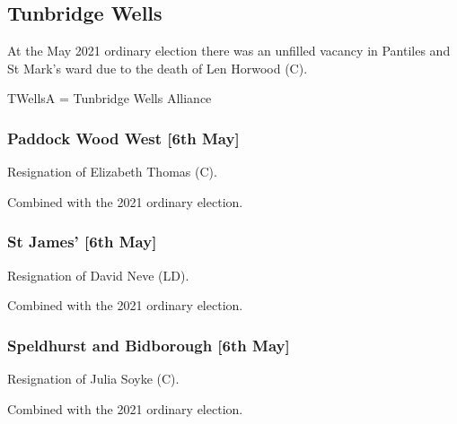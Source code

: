 \documentclass[a4paper,openany]{book}
\begin{document}
\begin{resultsiii}
\subsection*{Tunbridge Wells}

At the May 2021 ordinary election there was an unfilled vacancy in Pantiles and St Mark's ward due to the death of Len Horwood (C).

TWellsA = Tunbridge Wells Alliance

\subsubsection*{Paddock Wood West \hspace*{\fill}\nolinebreak[1]%
	\enspace\hspace*{\fill}
	[6th May]}


Resignation of Elizabeth Thomas (C).

Combined with the 2021 ordinary election.

\subsubsection*{St James' \hspace*{\fill}\nolinebreak[1]%
	\enspace\hspace*{\fill}
	[6th May]}


Resignation of David Neve (LD).

Combined with the 2021 ordinary election.

\subsubsection*{Speldhurst and Bidborough \hspace*{\fill}\nolinebreak[1]%
	\enspace\hspace*{\fill}
	[6th May]}


Resignation of Julia Soyke (C).

Combined with the 2021 ordinary election.


\end{resultsiii}
\end{document}
